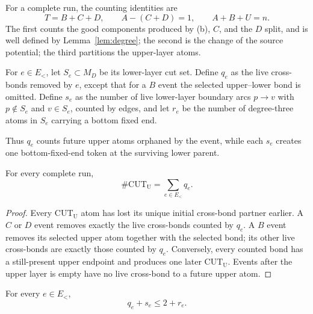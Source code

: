 \documentclass[12pt]{article}
\newcommand{\MD}{M_D}
\begin{document}
For a complete run, the counting identities are
\begin{equation}\label{eq:counting}
 T=B+C+D,\qquad A-(C+D)=1,\qquad A+B+U=n. \tag{2.0}
\end{equation}
The first counts the good components produced by (b), \(C\), and the \(D\)
split, and is well defined by Lemma~\ref{lem:degree}; the second is the change
of the source potential; the third partitions the upper-layer atoms.

For \(e\in E_<\), let \(S_e\subset\MD\) be its lower-layer cut set.  Define
\(q_e\) as the live cross-bonds removed by \(e\), except that for a \(B\) event
the selected upper--lower bond is omitted.  Define \(s_e\) as the number of
live lower-layer boundary arcs \(p\to v\) with \(p\notin S_e\) and
\(v\in S_e\), counted by edges, and let \(r_e\) be the number of degree-three
atoms in \(S_e\) carrying a bottom fixed end.

Thus \(q_e\) counts future upper atoms orphaned by the event, while each
\(s_e\) creates one bottom-fixed-end token at the surviving lower parent.

\begin{lemma}
For every complete run,
\begin{equation}
  \#\mathrm{CUT_U}=\sum_{e\in E_<}q_e. \tag{2.1}
\end{equation}
\end{lemma}

\begin{proof}
Every \(\mathrm{CUT_U}\) atom has lost its unique initial cross-bond partner
earlier.  A \(C\) or \(D\) event removes exactly the live cross-bonds counted
by \(q_e\).  A \(B\) event removes its selected upper atom together with the
selected bond; its other live cross-bonds are exactly those counted by \(q_e\).
Conversely, every counted bond has a still-present upper endpoint and produces
one later \(\mathrm{CUT_U}\).  Events after the upper layer is empty have no
live cross-bond to a future upper atom.\end{proof}

\begin{lemma}
For every \(e\in E_<\),
\begin{equation}
 q_e+s_e\le2+r_e. \tag{2.2}
\end{equation}
\end{lemma}
\end{document}
